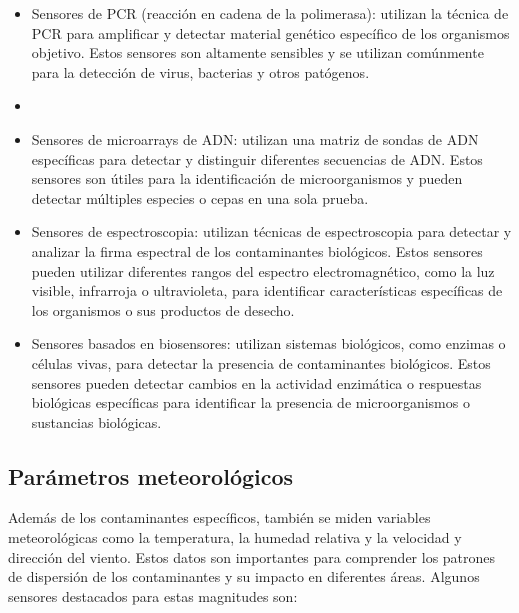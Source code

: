 \begin{itemize}
  \item Sensores de PCR (reacción en cadena de la polimerasa): utilizan la técnica de PCR para amplificar y detectar material genético específico de los organismos objetivo. Estos sensores son altamente sensibles y se utilizan comúnmente para la detección de virus, bacterias y otros patógenos.
  \item {}
  \item Sensores de microarrays de ADN: utilizan una matriz de sondas de ADN específicas para detectar y distinguir diferentes secuencias de ADN. Estos sensores son útiles para la identificación de microorganismos y pueden detectar múltiples especies o cepas en una sola prueba.
  \item Sensores de espectroscopia: utilizan técnicas de espectroscopia para detectar y analizar la firma espectral de los contaminantes biológicos. Estos sensores pueden utilizar diferentes rangos del espectro electromagnético, como la luz visible, infrarroja o ultravioleta, para identificar características específicas de los organismos o sus productos de desecho.
  \item Sensores basados en biosensores: utilizan sistemas biológicos, como enzimas o células vivas, para detectar la presencia de contaminantes biológicos. Estos sensores pueden detectar cambios en la actividad enzimática o respuestas biológicas específicas para identificar la presencia de microorganismos o sustancias biológicas.
\end{itemize}

\subsection{Parámetros meteorológicos}

Además de los contaminantes específicos, también se miden variables meteorológicas como la temperatura, la humedad relativa y la velocidad y dirección del viento. Estos datos son importantes para comprender los patrones de dispersión de los contaminantes y su impacto en diferentes áreas. Algunos sensores destacados para estas magnitudes son:

